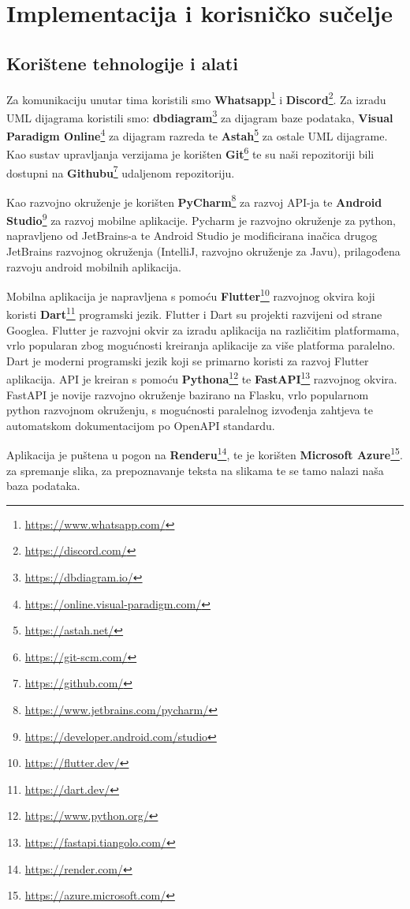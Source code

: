 \chapter{Implementacija i korisničko sučelje}
		
		
		\section{Korištene tehnologije i alati}
		
			 {Za komunikaciju unutar tima koristili smo \textbf{Whatsapp}\footnote{\url{https://www.whatsapp.com/}} i \textbf{Discord}\footnote{\url{https://discord.com/}}. Za izradu UML dijagrama koristili smo: \textbf{dbdiagram}\footnote{\url{https://dbdiagram.io/}} za dijagram baze podataka, \textbf{Visual Paradigm Online}\footnote{\url{https://online.visual-paradigm.com/}} za dijagram razreda te \textbf{Astah}\footnote{\url{https://astah.net/}} za ostale UML dijagrame. Kao sustav upravljanja verzijama je korišten \textbf{Git}\footnote{\url{https://git-scm.com/}} te su naši repozitoriji bili dostupni na \textbf{Githubu}\footnote{\url{https://github.com/}} udaljenom repozitoriju.
			 	
		 	Kao razvojno okruženje je korišten \textbf{PyCharm}\footnote{\url{https://www.jetbrains.com/pycharm/}} za razvoj API-ja te \textbf{Android Studio}\footnote{\url{https://developer.android.com/studio}} za razvoj mobilne aplikacije. Pycharm je razvojno okruženje za python, napravljeno od JetBrains-a te Android Studio je modificirana inačica drugog JetBrains razvojnog okruženja (IntelliJ, razvojno okruženje za Javu), prilagođena razvoju android mobilnih aplikacija.
		 	
		 	Mobilna aplikacija je napravljena s pomoću \textbf{Flutter}\footnote{\url{https://flutter.dev/}} razvojnog okvira koji koristi \textbf{Dart}\footnote{\url{https://dart.dev/}} programski jezik. Flutter i Dart su projekti razvijeni od strane Googlea. Flutter je razvojni okvir za izradu aplikacija na različitim platformama, vrlo popularan zbog mogućnosti kreiranja aplikacije za više platforma paralelno. Dart je moderni programski jezik koji se primarno koristi za razvoj Flutter aplikacija.
		 	API je kreiran s pomoću \textbf{Pythona}\footnote{\url{https://www.python.org/}} te \textbf{FastAPI}\footnote{\url{https://fastapi.tiangolo.com/}} razvojnog okvira. FastAPI je novije razvojno okruženje bazirano na Flasku, vrlo popularnom python razvojnom okruženju, s mogućnosti paralelnog izvođenja zahtjeva te automatskom dokumentacijom po OpenAPI standardu.
		 	
		 	Aplikacija je puštena u pogon na \textbf{Renderu}\footnote{\url{https://render.com/}}, te je korišten \textbf{Microsoft Azure}\footnote{\url{https://azure.microsoft.com/}}.
	 	 	za spremanje slika, za prepoznavanje teksta na slikama te se tamo nalazi naša baza podataka.
			 }
			 		
